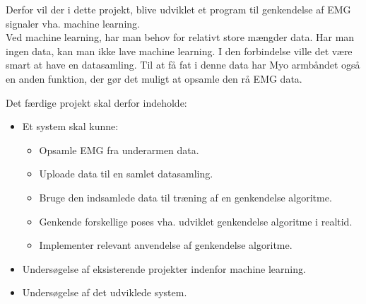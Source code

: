 Derfor vil der i dette projekt, blive udviklet et program til genkendelse af EMG signaler vha. machine learning. \\
Ved machine learning, har man behov for relativt store mængder data. Har man ingen data, kan man ikke lave machine learning. I den forbindelse ville det være smart at have en datasamling. Til at få fat i denne data har Myo armbåndet også en anden funktion, der gør det muligt at opsamle den rå EMG data.





Det færdige projekt skal derfor indeholde:
\begin{itemize}
\item Et system skal kunne:
	\begin{itemize}
		\item Opsamle EMG fra underarmen data.
		\item Uploade data til en samlet datasamling.
		\item Bruge den indsamlede data til træning af en genkendelse algoritme.
		\item Genkende forskellige poses vha. udviklet genkendelse algoritme i realtid.
		\item Implementer relevant anvendelse af genkendelse algoritme.
	\end{itemize}
\item Undersøgelse af eksisterende projekter indenfor machine learning.
\item Undersøgelse af det udviklede system.
\end{itemize}
